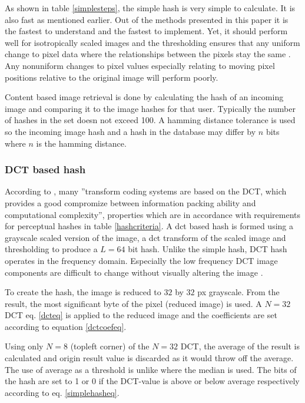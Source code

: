 \documentclass[english,12pt,a4paper,pdftex,elec,utf8]{aaltothesis}
\begin{document}
As shown in table \ref{simplesteps}, the simple hash is very simple to calculate. It is also fast as mentioned earlier. Out of the methods presented in this paper it is the fastest to understand and the fastest to implement. Yet, it should perform well for isotropically scaled images and the thresholding ensures that any uniform change to pixel data where the relationships between the pixels stay the same \cite{Zauner2010}. Any nonuniform changes to pixel values especially relating to moving pixel positions relative to the original image will perform poorly.

Content based image retrieval is done by calculating the hash of an incoming image and comparing it to the image hashes for that user. Typically the number of hashes in the set doesn not exceed 100. A hamming distance tolerance is used so the incoming image hash and a hash in the database may differ by $n$ bits where $n$ is the hamming distance.


\subsubsection{DCT based hash}
According to \cite{Gonzalez2002}, many ''transform coding systems are based on the DCT, which provides a good compromize between information packing ability and computational complexity'', properties which are in accordance with requirements for perceptual hashes in table \ref{hashcriteria}. A dct based hash is formed using a grayscale scaled version of the image, a dct transform of the scaled image and thresholding to produce a $L=64$ bit hash. Unlike the simple hash, DCT hash operates in the frequency domain. Especially the low frequency DCT image components are difficult to change without visually altering the image \cite{Fridrich1999}.

To create the hash, the image is reduced to $32$ by $32$ px grayscale. From the result, the most significant byte of the pixel (reduced image) is used. A $N =32$ DCT eq. \ref{dcteq} is applied to the reduced image and the coefficients are set according to equation \ref{dctcoefeq}.


Using only $N = 8$ (topleft corner) of the $N=32$ DCT, the average of the result is calculated and origin result value is discarded as it would throw off the average. The use of average as a threshold is unlike \cite{Coskun2004} where the median is used. The bits of the hash are set to 1 or 0 if the DCT-value is above or below average respectively according to eq. \ref{simplehasheq}.
\end{document}

